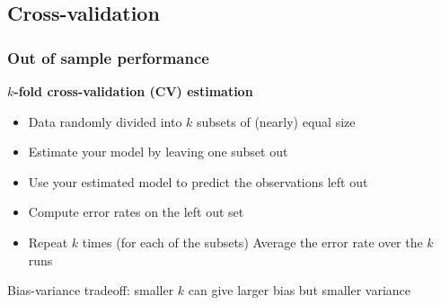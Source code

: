 \documentclass[a4paper]{article}
\begin{document}
\subsection{Cross-validation}
\subsubsection{Out of sample performance}
\textbf{\( k \)-fold cross-validation (CV) estimation}
\begin{itemize}
	\item Data randomly divided into \( k \) subsets of (nearly) equal size
	\item Estimate your model by leaving one subset out
	\item Use your estimated model to predict the observations left out
	\item Compute error rates on the left out set
	\item Repeat \( k \) times (for each of the subsets) Average the error rate over the \( k \) runs
\end{itemize}
Bias-variance tradeoff: smaller \( k \) can give larger bias but smaller variance
\end{document}
